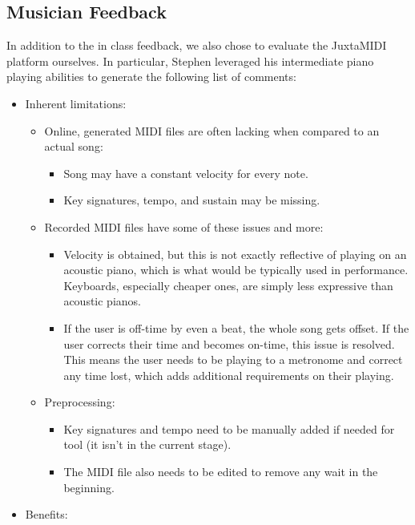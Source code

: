 \documentclass[journal]{vgtc}                %
\begin{document}
\subsection{Musician Feedback}

In addition to the in class feedback, we also chose to evaluate the JuxtaMIDI
platform ourselves. In particular, Stephen leveraged his intermediate piano
playing abilities to generate the following list of comments:

\begin{itemize}
  \item Inherent limitations:
  \begin{itemize}
    \item Online, generated MIDI files are often lacking when compared to an
    actual song:
    \begin{itemize}
      \item Song may have a constant velocity for every note.
      \item Key signatures, tempo, and sustain may be missing.
    \end{itemize}
    \item Recorded MIDI files have some of these issues and more:
    \begin{itemize}
      \item Velocity is obtained, but this is not exactly reflective of playing
      on an acoustic piano, which is what would be typically used in performance.
      Keyboards, especially cheaper ones, are simply less expressive than acoustic
      pianos.
      \item If the user is off-time by even a beat, the whole song gets offset.
      If the user corrects their time and becomes on-time, this issue is resolved.
      This means the user needs to be playing to a metronome and correct any time
      lost, which adds additional requirements on their playing.
    \end{itemize}
    \item Preprocessing:
    \begin{itemize}
      \item Key signatures and tempo need to be manually added if needed for tool
      (it isn’t in the current stage).
      \item The MIDI file also needs to be edited to remove any wait in the
      beginning.
    \end{itemize}
  \end{itemize}
  \item Benefits:
  \begin{itemize}

\end{itemize}
\end{itemize}
\end{document}
